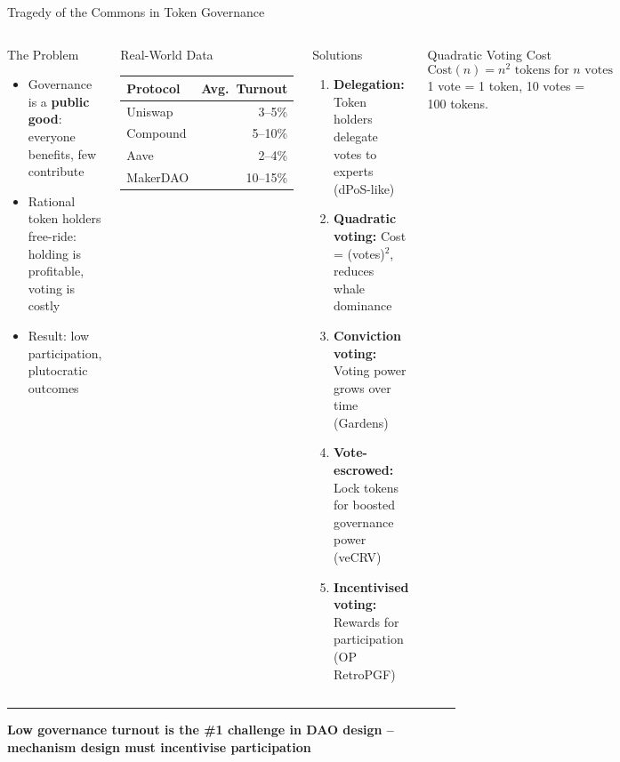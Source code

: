 \documentclass[8pt,aspectratio=169]{beamer}
\newcommand{\bottomnote}[1]{\vfill\vspace{-2mm}\textcolor{mllavender2}{\rule{\textwidth}{0.4pt}}\vspace{1mm}\footnotesize\textbf{#1}}
\begin{document}
\begin{frame}{Tragedy of the Commons in Token Governance}
\begin{columns}[T]
\begin{block}{The Problem}
\footnotesize
\begin{itemize}
  \item Governance is a \textbf{public good}: everyone benefits, few contribute
  \item Rational token holders free-ride: holding is profitable, voting is costly
  \item Result: low participation, plutocratic outcomes
\end{itemize}
\end{block}
\vspace{2mm}
\begin{alertblock}{\footnotesize Real-World Data}
\footnotesize
\begin{tabular}{lr}
\toprule
\textbf{Protocol} & \textbf{Avg.\ Turnout} \\
\midrule
Uniswap & 3--5\% \\
Compound & 5--10\% \\
Aave & 2--4\% \\
MakerDAO & 10--15\% \\
\bottomrule
\end{tabular}
\end{alertblock}

\begin{block}{Solutions}
\footnotesize
\begin{enumerate}
  \item \textbf{Delegation:} Token holders delegate votes to experts (dPoS-like)
  \item \textbf{Quadratic voting:} Cost = (votes)$^2$, reduces whale dominance
  \item \textbf{Conviction voting:} Voting power grows over time (Gardens)
  \item \textbf{Vote-escrowed:} Lock tokens for boosted governance power (veCRV)
  \item \textbf{Incentivised voting:} Rewards for participation (OP RetroPGF)
\end{enumerate}
\end{block}
\vspace{1mm}
\begin{exampleblock}{\footnotesize Quadratic Voting Cost}
\footnotesize
\[
\text{Cost}(n) = n^2 \text{ tokens for } n \text{ votes}
\]
1 vote = 1 token, 10 votes = 100 tokens.
\end{exampleblock}
\end{columns}
\bottomnote{Low governance turnout is the \#1 challenge in DAO design -- mechanism design must incentivise participation}
\end{frame}
\end{document}
